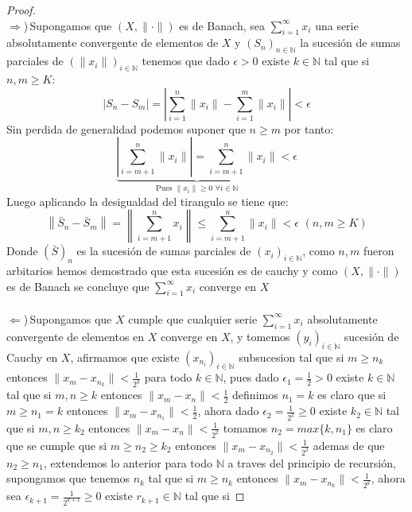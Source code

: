 \documentclass[11pt,letterpaper]{article}
\newcommand{\N}{\mathbb{N}}
\begin{document}
\begin{proof}\,\\
    $\Rightarrow$)\,Supongamos que $(X,\|\cdot\|)$ es de Banach, sea $\sum_{i=1} ^{\infty}x_i$ una serie absolutamente convergente de elementos de $X$ y $(S_n)_{n\in \N}$ la sucesi\'on de sumas parciales de $(\|x_i\|)_{i\in \N}$ tenemos que
    dado $\epsilon>0$ existe $k\in \N$ tal que si $n,m\geq K$:\,\\
    \begin{equation*}
        \left|S_n-S_m\right|= \left|\sum_{i=1}^{n}\|x_i\|-\sum_{i=1}^m\|x_i\|\right|<\epsilon
    \end{equation*}
    Sin perdida de generalidad podemos suponer que $n\geq m$ por tanto:\,\\
    \begin{equation*}
        \underbrace{\left| \sum_{i=m+1}^n\|x_i\|\right|=\sum_{i=m+1}^n\|x_i\|}_{\text{Pues}\,\,\|x_i\|\geq 0\,\,\forall i\in \N}< \epsilon
    \end{equation*}
    Luego aplicando la desigualdad del tirangulo se tiene que:\,\\
    \begin{equation*}
        \left\|\bar{S}_n-\bar{S}_m\right\|=\left\|\sum_{i=m+1}^n x_i\right\|\leq \sum_{i=m+1}^n\|x_i\|< \epsilon\,\,(n,m\geq K)
    \end{equation*}
    Donde $(\bar{S})_n$ es la sucesi\'on de sumas parciales de $(x_i)_{i\in \N}$, como $n,m$ fueron arbitarios hemos demostrado que esta sucesi\'on es de cauchy y como $(X,\|\cdot\|)$ es de Banach se concluye que $\sum_{i=1}^{\infty}x_i$ converge en $X$
    \,\\
    \,\\
    $\Leftarrow$)\,Supongamos que $X$ cumple que cualquier serie $\sum_{i=1}^{\infty}x_i$ absolutamente convergente de elementos en $X$ converge en $X$, y tomemos $(y_i)_{i\in \N}$ sucesi\'on de Cauchy en $X$, afirmamos que existe $(x_{n_i})_{i\in \N}$ subsucesion tal que si $m\geq n_{k}$ entonces $\|x_m-x_{n_k}\|< \frac{1}{2^{k}}$ para todo $k\in \N$,
    pues dado $\epsilon_1=\frac{1}{2}>0$ existe $k\in \N$ tal que si $m,n\geq k$ entonces $\|x_m-x_n\|<\frac{1}{2}$ definimos $n_1=k$ es claro que si $m\geq n_1=k$ entonces $\|x_m-x_{n_1}\|< \frac{1}{2}$, ahora dado $\epsilon_2=\frac{1}{2^2}\geq 0$ existe $k_2\in \N$ tal que si $m,n\geq k_2$ entonces $\|x_m-x_n\|<\frac{1}{2^2}$ tomamos $n_2=max\{k,n_1\}$ es claro que se cumple que si $m\geq n_2\geq k_2$ entonces $\|x_m-x_{n_2}\|<\frac{1}{2^2}$ ademas de que $n_2\geq n_1$, extendemos lo anterior para todo $\N$ a traves del principio de recursi\'on, supongamos que tenemos $n_k$ tal que si $m\geq n_k$ entonces $\|x_{m}-x_{n_k}\|<\frac{1}{2^k}$, ahora sea $\epsilon_{k+1}=\frac{1}{2^{k+1}}\geq 0$ existe $r_{k+1}\in \N$ tal que si

\end{proof}
\end{document}
